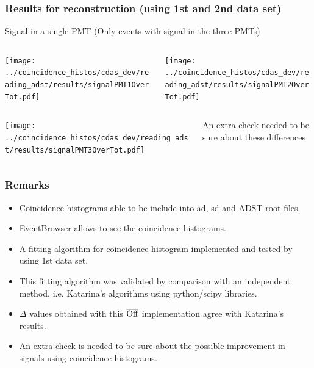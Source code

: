 \documentclass[aspectratio=169]{beamer}
\def\Offline{\mbox{$\overline{\rm Off}$\hspace{.05em}\raisebox{.4ex}{$\underline{\rm line}$}}\xspace}
\begin{document}
\begin{frame}
  \frametitle{Results for reconstruction (using 1st and 2nd data
  set)}
  Signal in a single PMT
  (Only events with signal in the three PMTs)

  \begin{columns}
    \centering
    \begin{column}{0.5\textwidth}
      \texttt{[image: ../coincidence\_histos/cdas\_dev/reading\_adst/results/signalPMT1OverTot.pdf]}
    \end{column}
    \begin{column}{0.5\textwidth}
      \texttt{[image: ../coincidence\_histos/cdas\_dev/reading\_adst/results/signalPMT2OverTot.pdf]}
    \end{column}
  \end{columns}
  \begin{columns}
    \centering
    \begin{column}{0.5\textwidth}
      \texttt{[image: ../coincidence\_histos/cdas\_dev/reading\_adst/results/signalPMT3OverTot.pdf]}
    \end{column}
    \begin{column}{0.5\textwidth}
      An extra check needed to be sure about these differences
    \end{column}
  \end{columns}
\end{frame}

\begin{frame}
  \frametitle{Remarks}
  \begin{itemize}
    \item Coincidence histograms able to be include into ad, sd and ADST root files.
    \item EventBrowser allows to see the coincidence histograms.
    \item A fitting algorithm for coincidence histogram
      implemented and tested by using 1st data set.
    \item This fitting algorithm was validated by comparison with
      an independent method, i.e. Katarina's algorithms using
      python/scipy libraries.
    \item $\Delta$ values obtained with this \Offline
      implementation agree with Katarina's results.
    \item An extra check is needed to be sure about the possible 
      improvement in signals using coincidence histograms.
  \end{itemize}
\end{frame}

 
\end{document}
